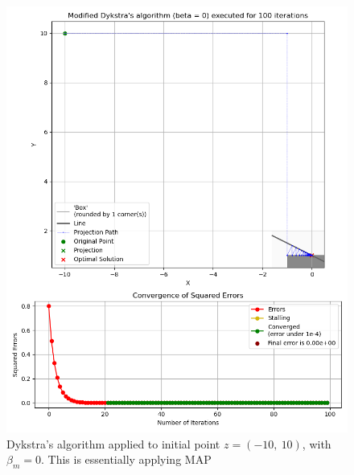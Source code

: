 \documentclass[hidelinks]{article}
\begin{document}
\begin{figure}[h!]
    \centering
    
    \includegraphics[width=1\textwidth]{Latex/Current Version/Figures/MAP_one_corner.png}
    \caption{Dykstra's algorithm applied to initial point $z = (-10,~10)$, with $\beta_m = 0$. This is essentially applying MAP}
    \label{fig:MAPtenten}

\end{figure}
%
\end{document}
